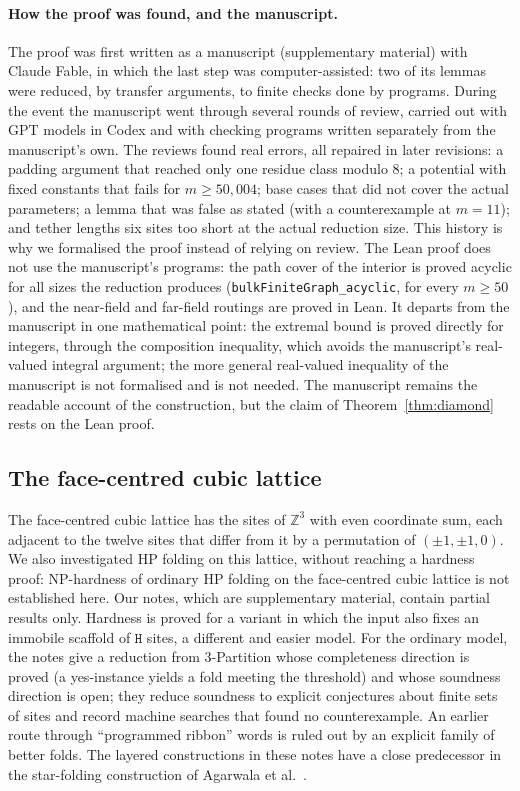 \documentclass[11pt,letterpaper]{article}
\theoremstyle{definition}
\theoremstyle{remark}
\newcommand{\Hh}{\mathtt{H}}
\newcommand{\lean}[1]{\texttt{#1}}
\newcommand{\Z}{\mathbb{Z}}
\begin{document}
\paragraph{How the proof was found, and the manuscript.}
The proof was first written as a manuscript (supplementary material) with Claude Fable, in which
the last step was computer-assisted: two of its lemmas were reduced, by transfer arguments, to
finite checks done by programs. During the event the manuscript went through several rounds of
review, carried out with GPT models in Codex and with checking programs written separately from the
manuscript's own. The reviews found real errors, all repaired in later revisions: a padding
argument that reached only one residue class modulo $8$; a potential with fixed constants that fails
for $m\ge 50{,}004$; base cases that did not cover the actual parameters; a lemma that was false as
stated (with a counterexample at $m=11$); and tether lengths six sites too short at the actual
reduction size. This history is why we formalised the proof instead of relying on review. The Lean
proof does not use the manuscript's programs: the path cover of the interior is proved acyclic for
all sizes the reduction produces (\lean{bulkFiniteGraph\_acyclic}, for every $m\ge50$), and the
near-field and far-field routings are proved in Lean. It departs from the manuscript in one
mathematical point: the extremal bound is proved directly for integers, through the composition
inequality, which avoids the manuscript's real-valued integral argument; the more general
real-valued inequality of the manuscript is not formalised and is not needed. The manuscript
remains the readable account of the construction, but the claim of Theorem~\ref{thm:diamond} rests
on the Lean proof.

\subsection{The face-centred cubic lattice}

The face-centred cubic lattice has the sites of $\Z^3$ with even coordinate sum, each adjacent to the
twelve sites that differ from it by a permutation of $(\pm1,\pm1,0)$. We also investigated HP
folding on this lattice, without reaching a hardness proof: NP-hardness of ordinary HP folding on
the face-centred cubic lattice is not established here. Our notes, which are supplementary material,
contain partial results only. Hardness is proved for a variant in which the input also fixes an
immobile scaffold of $\Hh$ sites, a different and easier model. For the ordinary model, the notes
give a reduction from 3-Partition whose completeness direction is proved (a yes-instance yields a
fold meeting the threshold) and whose soundness direction is open; they reduce soundness to explicit
conjectures about finite sets of sites and record machine searches that found no counterexample.
An earlier route through ``programmed ribbon'' words is ruled out by an explicit family of better
folds. The layered constructions in these notes have a close predecessor in the star-folding
construction of Agarwala et al.~\cite{Agarwala97}.
\end{document}

